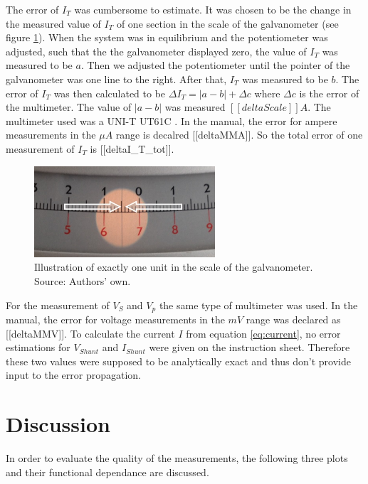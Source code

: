 \documentclass[a4paper]{article}
\begin{document}
The error of $I_T$ was cumbersome to estimate. It was chosen to be the change in the measured value of $I_T$ of one section in the scale of the galvanometer (see figure \ref{fig:scale}). When the system was in equilibrium and the potentiometer was adjusted, such that the the galvanometer displayed zero, the value of $I_T$ was measured to be $a$. Then we adjusted the potentiometer until the pointer of the galvanometer was one line to the right. After that, $I_T$ was measured to be $b$. The error of $I_T$ was then calculated to be $\Delta I_T = |a-b| + \Delta c$ where $\Delta c$ is the error of the multimeter. The value of $|a-b|$ was measured $[[deltaScale]] A$. The multimeter used was a UNI-T UT61C \cite{multimeter}. In the manual, the error for ampere measurements in the $\mu A$ range is decalred [[deltaMMA]]. So the total error of one measurement of $I_T$ is [[deltaI_T_tot]].

\begin{figure}[H]
\captionsetup{singlelinecheck=off}
\centering
\includegraphics[width=0.6\textwidth]{img/scale.jpg}
\caption[blubb]{Illustration of exactly one unit in the scale of the galvanometer. Source: Authors' own.}
\label{fig:scale}
\end{figure}

For the measurement of $V_S$ and $V_p$ the same type of multimeter was used. In the manual, the error for voltage measurements in the $mV$ range was declared as [[deltaMMV]].
\newline
To calculate the current $I$ from equation \eqref{eq:current}, no error estimations for $V_{Shunt}$ and $I_{Shunt}$ were given on the instruction sheet. Therefore these two values were supposed to be analytically exact and thus don't provide input to the error propagation.

\newpage
\section{Discussion}

In order to evaluate the quality of the measurements, the following three plots and their functional dependance are discussed.
\end{document}
